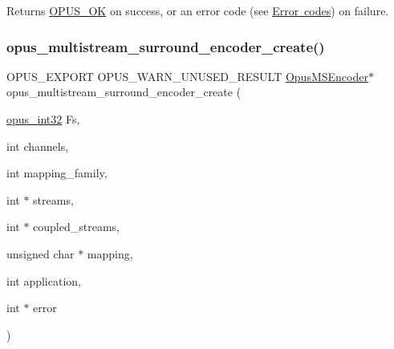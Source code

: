 \begin{DoxyReturn}{Returns}
\mbox{\hyperlink{group__opus__errorcodes_gaa44cf8a185e1b5cb940ef63eb4f02d21}{O\+P\+U\+S\+\_\+\+OK}} on success, or an error code (see \mbox{\hyperlink{group__opus__errorcodes}{Error codes}}) on failure. 
\end{DoxyReturn}
\mbox{\label{group__opus__multistream_ga1358d7af19572d163ec982447aa20ee9}} 
\subsubsection{\texorpdfstring{opus\_multistream\_surround\_encoder\_create()}{opus\_multistream\_surround\_encoder\_create()}}
{\footnotesize\ttfamily O\+P\+U\+S\+\_\+\+E\+X\+P\+O\+RT O\+P\+U\+S\+\_\+\+W\+A\+R\+N\+\_\+\+U\+N\+U\+S\+E\+D\+\_\+\+R\+E\+S\+U\+LT \mbox{\hyperlink{group__opus__multistream_gae5826674d142fc873ebc1d781c507dd7}{Opus\+M\+S\+Encoder}}$\ast$ opus\+\_\+multistream\+\_\+surround\+\_\+encoder\+\_\+create (\begin{DoxyParamCaption}\item[{\mbox{\hyperlink{opus__types_8h_aa4d309d6f80b99dbabebc8f98879ab9a}{opus\+\_\+int32}}}]{Fs,  }\item[{int}]{channels,  }\item[{int}]{mapping\+\_\+family,  }\item[{int $\ast$}]{streams,  }\item[{int $\ast$}]{coupled\+\_\+streams,  }\item[{unsigned char $\ast$}]{mapping,  }\item[{int}]{application,  }\item[{int $\ast$}]{error }\end{DoxyParamCaption})}

\mbox{\label{group__opus__multistream_ga21bf3d342217f28822f676b17bd21144}} 
